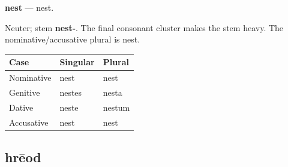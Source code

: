 \par\begin{minipage}{\linewidth}\raggedright
\textbf{nest} — nest.

Neuter; stem \textbf{nest-}. The final consonant cluster makes the stem heavy. The nominative/\allowbreak{}accusative plural is nest.

\par\begingroup
\fontsize{10.5}{13.2}\selectfont
\setlength{\LTleft}{0pt}\setlength{\LTright}{\fill}
\noindent
\begin{tabular}{@{}>{\raggedright\arraybackslash}p{39.46mm}>{\raggedright\arraybackslash}p{39.46mm}>{\raggedright\arraybackslash}p{39.46mm}@{}}
\toprule
\textbf{Case} & \textbf{Singular} & \textbf{Plural} \\
\midrule
Nominative & nest & nest \\
Genitive & nestes & nesta \\
Dative & neste & nestum \\
Accusative & nest & nest \\
\bottomrule
\end{tabular}
\par\endgroup

\end{minipage}\par
{}
\subsection*{hrēod}

